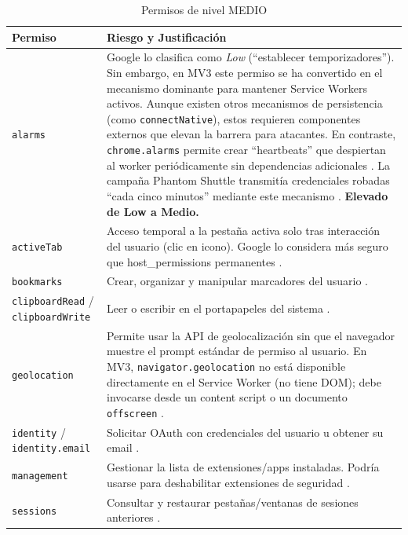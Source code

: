 \documentclass[12pt,oneside]{report}
\begin{document}
{\small
\begin{longtable}{|p{3.5cm}|p{11cm}|}
\hline
\textbf{Permiso} & \textbf{Riesgo y Justificación} \\
\hline
\endfirsthead
\hline
\endhead
\endfoot
\hline
\caption{Permisos de nivel MEDIO}
\label{tab:medium_permissions}
\endlastfoot
\texttt{alarms} & Google lo clasifica como \textit{Low} (``establecer temporizadores''). Sin embargo, en MV3 este permiso se ha convertido en el mecanismo dominante para mantener Service Workers activos. Aunque existen otros mecanismos de persistencia (como \texttt{connectNative}), estos requieren componentes externos que elevan la barrera para atacantes. En contraste, \texttt{chrome.alarms} permite crear ``heartbeats'' que despiertan al worker periódicamente sin dependencias adicionales \cite{chrome_alarms_docs}. La campaña Phantom Shuttle transmitía credenciales robadas ``cada cinco minutos'' mediante este mecanismo \cite{socket2025phantom}. \textbf{Elevado de Low a Medio.} \\
\hline
\texttt{activeTab} & Acceso temporal a la pestaña activa solo tras interacción del usuario (clic en icono). Google lo considera más seguro que host\_permissions permanentes \cite{google_permission_risk}. \\
\hline
\texttt{bookmarks} & Crear, organizar y manipular marcadores del usuario \cite{google_permission_risk}. \\
\hline
\texttt{clipboardRead} / \texttt{clipboardWrite} & Leer o escribir en el portapapeles del sistema \cite{google_permission_risk}. \\
\hline
\texttt{geolocation} & Permite usar la API de geolocalización sin que el navegador muestre el prompt estándar de permiso al usuario. En MV3, \texttt{navigator.geolocation} no está disponible directamente en el Service Worker (no tiene DOM); debe invocarse desde un content script o un documento \texttt{offscreen} \cite{google_permission_risk}. \\
\hline
\texttt{identity} / \texttt{identity.email} & Solicitar OAuth con credenciales del usuario u obtener su email \cite{google_permission_risk}. \\
\hline
\texttt{management} & Gestionar la lista de extensiones/apps instaladas. Podría usarse para deshabilitar extensiones de seguridad \cite{google_permission_risk}. \\
\hline
\texttt{sessions} & Consultar y restaurar pestañas/ventanas de sesiones anteriores \cite{google_permission_risk}. \\
\hline

\end{longtable}}
\end{document}
